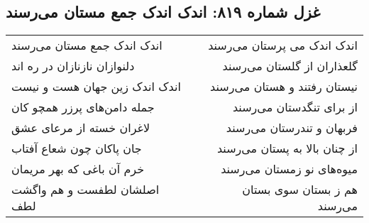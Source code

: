 \begin{center}
\section*{غزل شماره ۸۱۹: اندک اندک جمع مستان می‌رسند}
\label{sec:0819}
\begin{longtable}{l p{0.5cm} r}
اندک اندک جمع مستان می‌رسند
&&
اندک اندک می پرستان می‌رسند
\\
دلنوازان نازنازان در ره اند
&&
گلعذاران از گلستان می‌رسند
\\
اندک اندک زین جهان هست و نیست
&&
نیستان رفتند و هستان می‌رسند
\\
جمله دامن‌های پرزر همچو کان
&&
از برای تنگدستان می‌رسند
\\
لاغران خسته از مرعای عشق
&&
فربهان و تندرستان می‌رسند
\\
جان پاکان چون شعاع آفتاب
&&
از چنان بالا به پستان می‌رسند
\\
خرم آن باغی که بهر مریمان
&&
میوه‌های نو زمستان می‌رسند
\\
اصلشان لطفست و هم واگشت لطف
&&
هم ز بستان سوی بستان می‌رسند
\\
\end{longtable}
\end{center}
